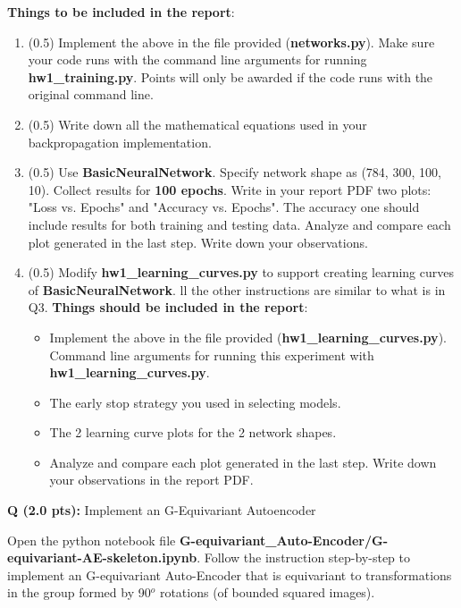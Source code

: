 \documentclass{article}
\newcommand{\homeworknumber}{1}
\newcounter{questionno}
\newcounter{partno}
\newcommand{\question}[1]{
\noindent
\newline
\stepcounter{questionno}
\setcounter{partno}{0}
{\bf Q\arabic{questionno} (#1 pts): }
}
\begin{document}
\noindent \textbf{Things to be included in the report}:
\begin{enumerate}
  \item (0.5) Implement the above in the file provided (\textbf{networks.py}). Make sure your code runs with the command line arguments for running \textbf{hw\homeworknumber\_training.py}. Points will only be awarded if the code runs with the original command line.
  \item (0.5) Write down all the mathematical equations used in your backpropagation implementation.
      \vspace{5in}
  \item (0.5) Use \textbf{BasicNeuralNetwork}. Specify network shape as (784, 300, 100, 10). Collect results for \textbf{100 epochs}.
        Write in your report PDF two plots: "Loss vs. Epochs" and "Accuracy vs. Epochs". The
        accuracy one should include results for both training and
        testing data. Analyze and compare each plot generated in the last step. Write down your observations.
            \vspace{3in}
 \item (0.5) \noindent Modify \textbf{hw\homeworknumber\_learning\_curves.py} to support creating learning curves of \textbf{BasicNeuralNetwork}.
ll the other instructions are similar to what is in Q3. \textbf{Things should be included in the report}:
  \begin{itemize}
    \item Implement the above in the file provided (\textbf{hw\homeworknumber\_learning\_curves.py}). Command line arguments for running this experiment with \textbf{hw\homeworknumber\_learning\_curves.py}.
    \item The early stop strategy you used in selecting models.
    \item The 2 learning curve plots for the 2 network shapes.
    \item Analyze and compare each plot generated in the last step. Write down
          your observations in the report PDF.
  \end{itemize}

\end{enumerate}

\newpage
\question{2.0}{Implement an G-Equivariant Autoencoder}

Open the python notebook file
\textbf{G-equivariant\_Auto-Encoder/G-equivariant-AE-skeleton.ipynb}. Follow the instruction step-by-step to implement an G-equivariant Auto-Encoder that is equivariant to transformations in the group formed by 90$^o$ rotations (of bounded squared images). 
\end{document}
